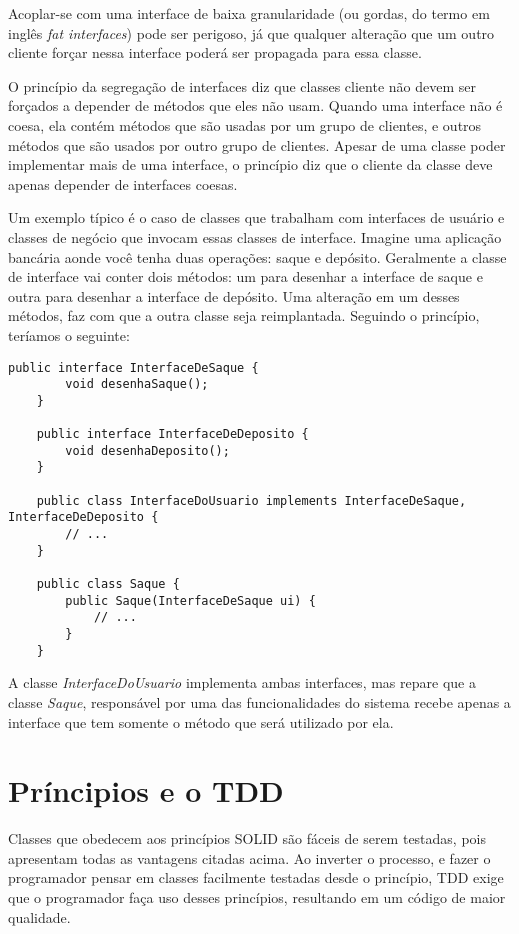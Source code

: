 Acoplar-se com uma interface de baixa granularidade (ou gordas, do termo
em inglês \textit{fat interfaces}) pode ser perigoso, já que qualquer alteração
que um outro cliente forçar nessa interface poderá ser propagada para essa
classe.

O princípio da segregação de interfaces diz que classes cliente não devem ser
forçados a depender de métodos que eles não usam. Quando uma interface não é
coesa, ela contém métodos que são usadas por um grupo de clientes, e outros 
métodos que são usados por outro grupo de clientes. Apesar de uma classe poder 
implementar mais de uma interface, o princípio diz que o cliente da classe  deve
apenas depender de interfaces coesas.

Um exemplo típico é o caso de classes que trabalham com interfaces de usuário e
classes  de negócio que invocam essas classes de interface. Imagine uma
aplicação bancária aonde você tenha duas operações: saque e depósito. Geralmente
a classe de interface vai conter dois métodos: um para desenhar a interface de
saque e outra para desenhar a interface de depósito. Uma alteração em um desses 
métodos, faz com que a outra classe seja reimplantada. Seguindo o princípio, 
teríamos o seguinte:

\begin{lstlisting}[frame=trbl]
	public interface InterfaceDeSaque {
		void desenhaSaque();
	}
	
	public interface InterfaceDeDeposito {
		void desenhaDeposito();
	}
	
	public class InterfaceDoUsuario implements InterfaceDeSaque, InterfaceDeDeposito {
		// ...
	}
	
	public class Saque {
		public Saque(InterfaceDeSaque ui) { 
			// ...
		}
	}
\end{lstlisting}

A classe \textit{InterfaceDoUsuario} implementa ambas interfaces, mas repare 
que a classe \textit{Saque}, responsável por uma das funcionalidades do sistema 
recebe apenas a interface que tem somente o método que será utilizado por ela.

\section{Príncipios e o TDD}

Classes que obedecem aos princípios SOLID são fáceis de serem testadas, pois
apresentam todas as vantagens citadas acima. Ao inverter o processo, e fazer o
programador pensar em classes facilmente testadas desde o princípio, TDD exige
que o programador faça uso desses princípios, resultando em um código de maior
qualidade.

